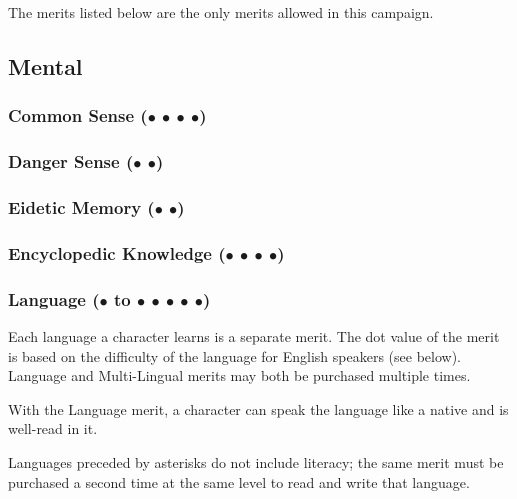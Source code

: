 \documentclass["../Misguided by Starlight.tex"]{subfiles}
\begin{document}

The merits listed below are the only merits allowed in this campaign.

\subsection{Mental}
	\subsubsection{Common Sense ($\bullet$ $\bullet$ $\bullet$ $\bullet$)}
	
	\subsubsection{Danger Sense ($\bullet$ $\bullet$)}
	
	\subsubsection{Eidetic Memory ($\bullet$ $\bullet$)}
	
	\subsubsection{Encyclopedic Knowledge ($\bullet$ $\bullet$ $\bullet$ $\bullet$)}
	
	\subsubsection{Language ($\bullet$ to $\bullet$ $\bullet$ $\bullet$ $\bullet$ $\bullet$)}
	Each language a character learns is a separate merit. The dot value of the merit is based on the difficulty of the language for English speakers (see below). Language and Multi-Lingual merits may both be purchased multiple times.

	With the Language merit, a character can speak the language like a native and is well-read in it.

	Languages preceded by asterisks do not include literacy; the same merit must be purchased a second time at the same level to read and write that language.
	
\end{document}
